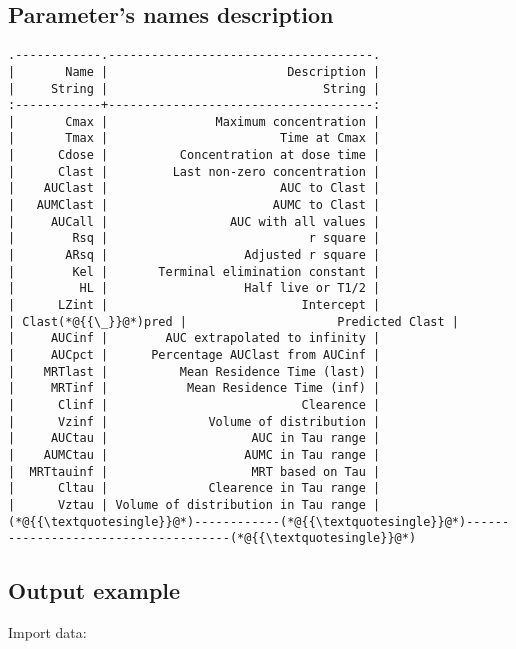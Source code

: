 \documentclass[12pt,a4paper]{article}
\begin{document}
\subsection{Parameter's names description}

\begin{lstlisting}
.------------.-------------------------------------.
|       Name |                         Description |
|     String |                              String |
:------------+-------------------------------------:
|       Cmax |               Maximum concentration |
|       Tmax |                        Time at Cmax |
|      Cdose |          Concentration at dose time |
|      Clast |         Last non-zero concentration |
|    AUClast |                        AUC to Clast |
|   AUMClast |                       AUMC to Clast |
|     AUCall |                 AUC with all values |
|        Rsq |                            r square |
|       ARsq |                   Adjusted r square |
|        Kel |       Terminal elimination constant |
|         HL |                   Half live or T1/2 |
|      LZint |                           Intercept |
| Clast(*@{{\_}}@*)pred |                     Predicted Clast |
|     AUCinf |        AUC extrapolated to infinity |
|     AUCpct |      Percentage AUClast from AUCinf |
|    MRTlast |          Mean Residence Time (last) |
|     MRTinf |           Mean Residence Time (inf) |
|      Clinf |                           Clearence |
|      Vzinf |              Volume of distribution |
|     AUCtau |                    AUC in Tau range |
|    AUMCtau |                   AUMC in Tau range |
|  MRTtauinf |                    MRT based on Tau |
|      Cltau |              Clearence in Tau range |
|      Vztau | Volume of distribution in Tau range |
(*@{{\textquotesingle}}@*)------------(*@{{\textquotesingle}}@*)-------------------------------------(*@{{\textquotesingle}}@*)
\end{lstlisting}


\subsection{Output example}
Import data:
\end{document}
